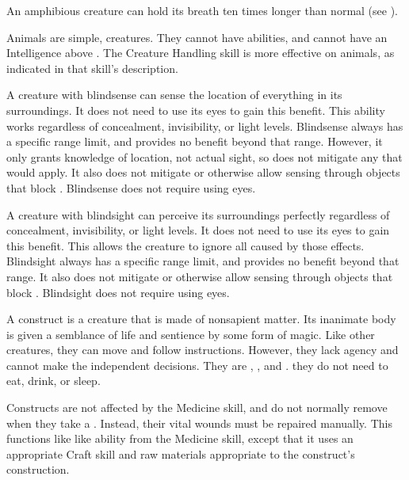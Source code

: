   An amphibious creature can hold its breath ten times longer than normal (see ).

  Animals are simple,  creatures.
  They cannot have \magical abilities, and cannot have an Intelligence above .
  The Creature Handling skill is more effective on animals, as indicated in that skill's description.

  A creature with blindsense can sense the location of everything in its surroundings.
  It does not need to use its eyes to gain this benefit.
  This ability works regardless of concealment, invisibility, or light levels.
  Blindsense always has a specific range limit, and provides no benefit beyond that range.
  However, it only grants knowledge of location, not actual sight, so does not mitigate any  that would apply.
  It also does not mitigate  or otherwise allow sensing through objects that block .
  Blindsense does not require using eyes.

  A creature with blindsight can perceive its surroundings perfectly regardless of concealment, invisibility, or light levels.
  It does not need to use its eyes to gain this benefit.
  This allows the creature to ignore all  caused by those effects.
  Blindsight always has a specific range limit, and provides no benefit beyond that range.
  It also does not mitigate  or otherwise allow sensing through objects that block .
  Blindsight does not require using eyes.

   A construct is a creature that is made of nonsapient matter.
  Its inanimate body is given a semblance of life and sentience by some form of magic.
  Like other creatures, they can move and follow instructions.
  However, they lack agency and cannot make the independent decisions.
  They are , , and .
  they do not need to eat, drink, or sleep.

  Constructs are not affected by the Medicine skill, and do not normally remove  when they take a .
  Instead, their vital wounds must be repaired manually.
  This functions like like  ability from the Medicine skill, except that it uses an appropriate Craft skill and raw materials appropriate to the construct's construction.


